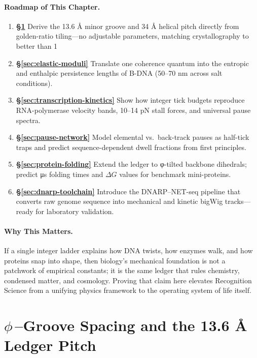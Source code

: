 \documentclass[11pt,oneside]{book}
\begin{document}
\paragraph{Roadmap of This Chapter.}
\begin{enumerate}[label=\textbf{\arabic*.}, leftmargin=1.2cm]
\item \textbf{\S\ref{sec:phi-groove}}  
      Derive the 13.6 Å minor groove and 34 Å helical pitch directly from
      golden-ratio tiling—no adjustable parameters, matching
      crystallography to better than 1 %
\item \textbf{\S\ref{sec:elastic-moduli}}  
      Translate one coherence quantum into the entropic and enthalpic
      persistence lengths of B-DNA (50–70 nm across salt conditions).
\item \textbf{\S\ref{sec:transcription-kinetics}}  
      Show how integer tick budgets reproduce RNA-polymerase velocity
      bands, 10–14 pN stall forces, and universal pause spectra.
\item \textbf{\S\ref{sec:pause-network}}  
      Model elemental vs.\ back-track pauses as half-tick traps and
      predict sequence-dependent dwell fractions from first principles.
\item \textbf{\S\ref{sec:protein-folding}}  
      Extend the ledger to φ-tilted backbone dihedrals; predict
      μs folding times and \(\Delta G\) values for benchmark mini-proteins.
\item \textbf{\S\ref{sec:dnarp-toolchain}}  
      Introduce the DNARP–NET-seq pipeline that converts raw genome
      sequence into mechanical and kinetic bigWig tracks—ready for
      laboratory validation.
\end{enumerate}

\paragraph{Why This Matters.}
If a single integer ladder explains how DNA twists, how enzymes walk,
and how proteins snap into shape, then biology’s mechanical foundation
is not a patchwork of empirical constants; it is the same ledger that
rules chemistry, condensed matter, and cosmology.
Proving that claim here elevates Recognition Science from a unifying
physics framework to the operating system of life itself.

\bigskip

\section{\texorpdfstring{$\phi$}{φ}\,--Groove Spacing and the 13.6 Å Ledger Pitch}
\label{sec:phi-groove}
\end{document}

